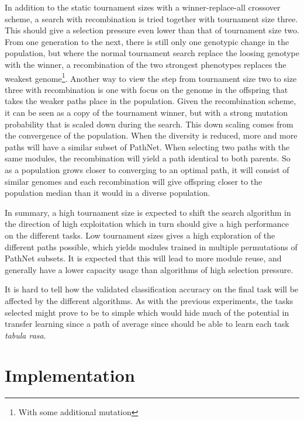 In addition to the static tournament sizes with a winner-replace-all crossover scheme, a search with recombination is tried together with tournament size three.  This should give a selection pressure even lower than that of tournament size two. From one generation to the next, there is still only one genotypic change in the population, but where the normal tournament search replace the loosing genotype with the winner, a recombination of the two strongest phenotypes replaces the weakest genome\footnote{With some additional mutation}.  Another way to view the step from tournament size two to size three with recombination is one with focus on the genome in the offspring that takes the weaker paths place in the population. Given the recombination scheme, it can be seen as a copy of the tournament winner, but with a strong mutation probability that is scaled down during the search. This down scaling comes from the convergence of the population. When the diversity is reduced, more and more paths will have a similar subset of PathNet. When selecting two paths with the same modules, the recombination will yield a path identical to both parents. So as a population grows closer to converging to an optimal path, it will consist of similar genomes and each recombination will give offspring closer to the population median than it would in a diverse population. 


In summary, a high tournament size is expected to shift the search algorithm in the direction of high exploitation which in turn should give a high performance on the different tasks. Low tournament sizes gives a high exploration of the different paths possible, which yields modules trained in multiple permutations of PathNet subsets. It is expected that this will lead to more module reuse, and generally have a lower capacity usage than algorithms of high selection pressure. 

It is hard to tell how the validated classification accuracy on the final task will be affected by the different algorithms. As with the previous experiments, the tasks selected might prove to be to simple which would hide much of the potential in transfer learning since a path of average since should be able to learn each task \textit{tabula rasa}.


\section{Implementation}\label{Search-implementation}
